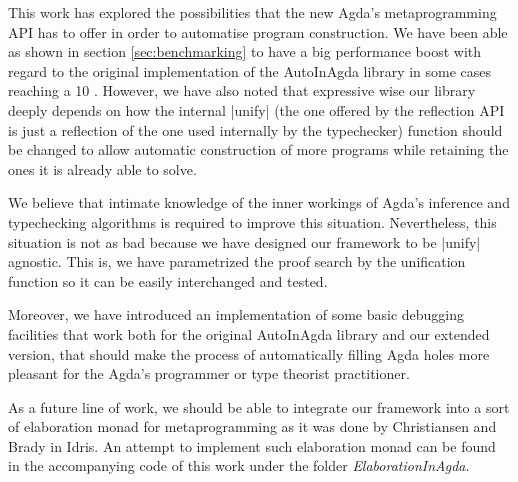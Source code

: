 \documentclass[a4paper]{article}
\begin{document}
This work has explored the possibilities that the new Agda's metaprogramming API
has to offer in order to automatise program construction. We have been able as
shown in section \ref{sec:benchmarking} to have a big performance boost with
regard to the original implementation of the AutoInAgda library in some cases
reaching a 10 . However, we have also noted that
expressive wise our library deeply depends on how the internal |unify| (the one
offered by the reflection API is just a reflection of the one used internally
by the typechecker) function should be changed to allow automatic construction
of more programs while retaining the ones it is already able to solve.

We believe that intimate knowledge of the inner workings of Agda's inference and
typechecking algorithms is required to improve this situation. Nevertheless,
this situation is not as bad because we have designed our framework to be
|unify| agnostic. This is, we have parametrized the proof search by the
unification function so it can be easily interchanged and tested.

Moreover, we have introduced an implementation of some basic debugging
facilities that work both for the original AutoInAgda library and our extended
version, that should make the process of automatically filling Agda holes more
pleasant for the Agda's programmer or type theorist practitioner.

As a future line of work, we should be able to integrate our framework into a
sort of elaboration monad for metaprogramming as it was done by Christiansen and
Brady \cite{Christiansen:2016:ERE:2951913.2951932} in Idris. An attempt to
implement such elaboration monad can be found in the accompanying code of this
work under the folder \emph{ElaborationInAgda}.

\appendix



\end{document}
